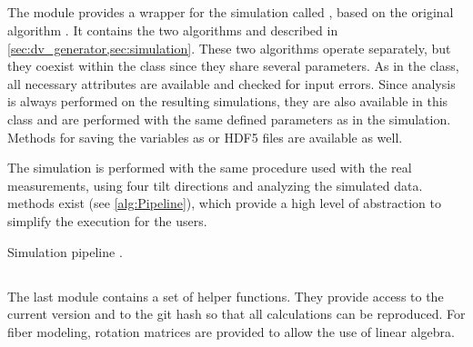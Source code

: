 \subsection{}
%
The  module provides a wrapper for the simulation called , based on the original algorithm \cite{Dohmen2015,Lucksch2016}.
It contains the two algorithms  and  described in \cref{sec:dv_generator,sec:simulation}.
These two algorithms operate separately, but they coexist within the class since they share several parameters.
As in the  class, all necessary attributes are available and checked for input errors.
Since analysis is always performed on the resulting simulations, they are also available in this class and are performed with the same defined parameters as in the simulation.
Methods for saving the variables as  or \ac{HDF5} files are available as well.
\par
%
The simulation is performed with the same procedure used with the real measurements, using four tilt directions and analyzing the simulated data.
 methods exist (see \cref{alg:Pipeline}), which provide a high level of abstraction to simplify the execution for the users.
%
\begin{lstfloat}[!tb]
\centering
\scalebox{0.75}{
\begin{minipage}{\the\textwidth}

\end{minipage}}
\caption[]{Simulation pipeline .}
\label{alg:Pipeline}
\end{lstfloat}
%
%
%
\subsection{}
%
The last module contains a set of helper functions.
They provide access to the current version and  to the git hash so that all calculations can be reproduced.
For fiber modeling, rotation matrices are provided to allow the use of linear algebra.
%
%
%
